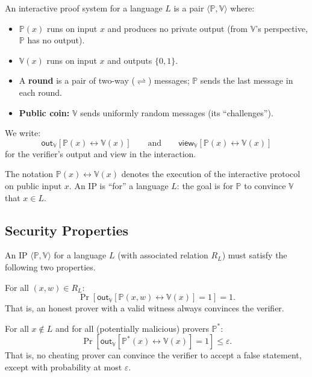 \documentclass[11pt]{article}
\theoremstyle{plain}
\theoremstyle{definition}
\newcommand{\outV}{\mathsf{out}_\mathbb{V}}
\newcommand{\viewV}{\mathsf{view}_\mathbb{V}}
\begin{document}
\begin{tcolorbox}[colback=blue!5!white, colframe=blue!60!black, title={Definition: Interactive Proof System}]
  An interactive proof system for a language $L$ is a pair $\langle \mathbb{P}, \mathbb{V} \rangle$
  where:
  \begin{itemize}
    \item $\mathbb{P}(x)$ runs on input $x$ and produces no private output (from $\mathbb{V}$'s
          perspective, $\mathbb{P}$ has no output).
    \item $\mathbb{V}(x)$ runs on input $x$ and outputs $\{0,1\}$.
    \item A \textbf{round} is a pair of two-way ($\rightleftharpoons$) messages; $\mathbb{P}$ sends the last message in each round.
    \item \textbf{Public coin:} $\mathbb{V}$ sends uniformly random messages (its ``challenges'').
  \end{itemize}

  We write:
  \[
    \outV[\mathbb{P}(x) \leftrightarrow \mathbb{V}(x)]
    \qquad \text{and} \qquad
    \viewV[\mathbb{P}(x) \leftrightarrow \mathbb{V}(x)]
  \]
  for the verifier's output and view in the interaction.
\end{tcolorbox}

\medskip
The notation $\mathbb{P}(x) \leftrightarrow \mathbb{V}(x)$ denotes the execution of the interactive
protocol on public input $x$. An IP is ``for'' a language $L$: the goal is for $\mathbb{P}$ to
convince $\mathbb{V}$ that $x \in L$.

\subsection{Security Properties}

An IP $\langle \mathbb{P}, \mathbb{V} \rangle$ for a language $L$ (with associated relation $R_L$)
must satisfy the following two properties.

\begin{tcolorbox}[colback=green!8, colframe=green!50!black, title={Completeness}]
  For all $(x, w) \in R_L$:
  \[
    \Pr\!\left[\outV\!\left[\mathbb{P}(x, w) \leftrightarrow \mathbb{V}(x)\right] = 1\right] = 1.
  \]
  That is, an honest prover with a valid witness always convinces the verifier.
\end{tcolorbox}

\begin{tcolorbox}[colback=red!8, colframe=red!50!black, title={$\varepsilon$-Soundness}]
  For all $x \notin L$ and for all (potentially malicious) provers $\mathbb{P}^*$:
  \[
    \Pr\!\left[\outV\!\left[\mathbb{P}^*(x) \leftrightarrow \mathbb{V}(x)\right] = 1\right] \leq \varepsilon.
  \]
  That is, no cheating prover can convince the verifier to accept a false statement, except with
  probability at most $\varepsilon$.
\end{tcolorbox}
\end{document}
